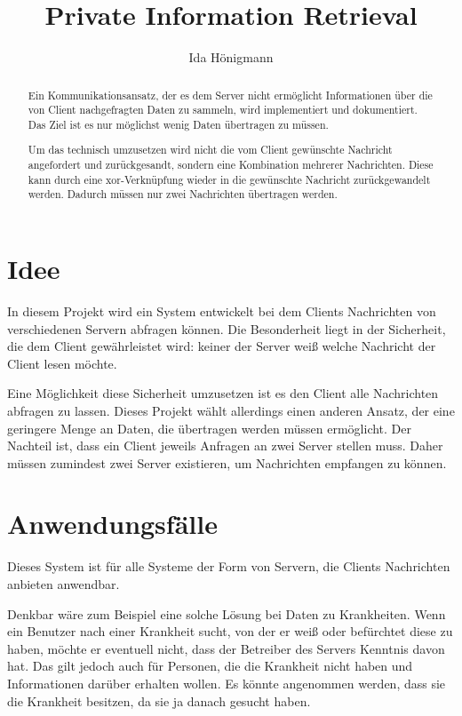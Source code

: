 \documentclass[]{article}
\title{Private Information Retrieval}
\author{Ida Hönigmann}
\begin{document}
\maketitle

\begin{abstract}
Ein Kommunikationsansatz, der es dem Server nicht ermöglicht Informationen über die von Client nachgefragten Daten zu sammeln, wird implementiert und dokumentiert. Das Ziel ist es nur möglichst wenig Daten übertragen zu müssen.

Um das technisch umzusetzen wird nicht die vom Client gewünschte Nachricht angefordert und zurückgesandt, sondern eine Kombination mehrerer Nachrichten. Diese kann durch eine xor-Verknüpfung wieder in die gewünschte Nachricht zurückgewandelt werden. Dadurch müssen nur zwei Nachrichten übertragen werden.
\end{abstract}

\section{Idee}
In diesem Projekt wird ein System entwickelt bei dem Clients Nachrichten von verschiedenen Servern abfragen können. Die Besonderheit liegt in der Sicherheit, die dem Client gewährleistet wird: keiner der Server weiß welche Nachricht der Client lesen möchte.

Eine Möglichkeit diese Sicherheit umzusetzen ist es den Client alle Nachrichten abfragen zu lassen. Dieses Projekt wählt allerdings einen anderen Ansatz, der eine geringere Menge an Daten, die übertragen werden müssen ermöglicht. Der Nachteil ist, dass ein Client jeweils Anfragen an zwei Server stellen muss. Daher müssen zumindest zwei Server existieren, um Nachrichten empfangen zu können.

\section{Anwendungsfälle}
Dieses System ist für alle Systeme der Form von Servern, die Clients Nachrichten anbieten anwendbar.

Denkbar wäre zum Beispiel eine solche Lösung bei Daten zu Krankheiten. Wenn ein Benutzer nach einer Krankheit sucht, von der er weiß oder befürchtet diese zu haben, möchte er eventuell nicht, dass der Betreiber des Servers Kenntnis davon hat. Das gilt jedoch auch für Personen, die die Krankheit nicht haben und Informationen darüber erhalten wollen. Es könnte angenommen werden, dass sie die Krankheit besitzen, da sie ja danach gesucht haben.
\end{document}
